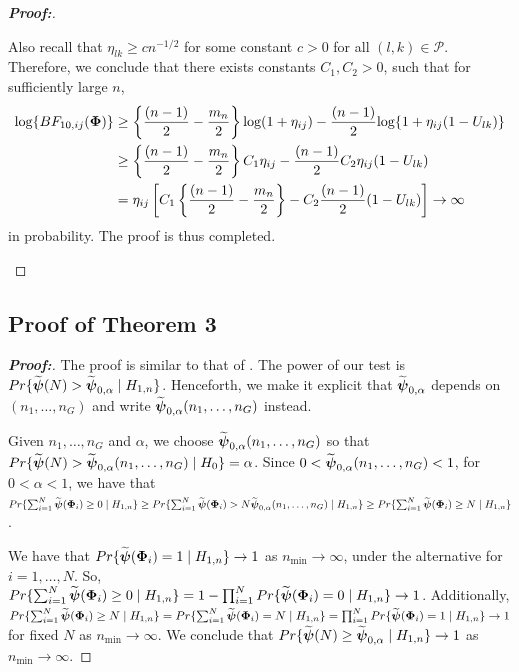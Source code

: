 \documentclass[times,sort&compress,3p]{elsarticle}
\theoremstyle{plain}%
\theoremstyle{definition}
\def\log{\hbox{log}}
\def\log{\hbox{log}}
\def\boldpsi{{\mbox{\boldmath $\psi$}}}
\newcommand{\uPhi}              {\mbox{\boldmath$\Phi$}}
\begin{document}
\begin{proof}[\textbf{\upshape Proof:}]
\begin{description}
{Also recall that $\eta_{lk} \geq cn^{-1/2}$ for some constant $c > 0$ for all $(l,k)\in\mathcal{P}$. Therefore, we conclude that there exists constants $C_1, C_2 > 0$, such that for sufficiently large $n$,
\begin{align*}
    \log\{BF_{10, ij}(\uPhi) \} & \geq \left\{\frac{(n - 1)}{2} - \frac{m_n}{2}\right\}\log(1 + \eta_{ij}) - \frac{(n - 1)}{2}\log\{1 + \eta_{ij}(1 - U_{lk})\}\\
    &\geq \left\{\frac{(n - 1)}{2} - \frac{m_n}{2}\right\}C_1\eta_{ij} - \frac{(n - 1)}{2}C_2\eta_{ij}(1 - U_{lk})\\
    & = \eta_{ij}\left[C_1\left\{\frac{(n - 1)}{2} - \frac{m_n}{2}\right\} - C_2\frac{(n - 1)}{2}(1 - U_{lk})\right]\to \infty
\end{align*}
in probability. The proof is thus completed. 
}

\end{description}
\end{proof}


\subsection*{Proof of Theorem 3}

\begin{proof}[\textbf{\upshape Proof:}]
The proof is similar to that of \cite{zoh2018powerful}. %
The power of our test is $Pr\{ \widetilde{\boldpsi}(N) > \widetilde{\boldpsi}_{0,\alpha}\mid  H_{1,n}\}$.
Henceforth, we make it explicit that $\widetilde{\boldpsi}_{0,\alpha}$ depends on $(n_1, \ldots ,n_G)$ and write $\widetilde{\boldpsi}_{0,\alpha}(n_1, \ldots, n_G)$ instead.

Given $n_1, \ldots, n_G$ and $\alpha$, we choose $\widetilde{\boldpsi}_{0,\alpha}(n_1, \ldots, n_G)$ so that $Pr\{\widetilde{\boldpsi}(N) > \widetilde{\boldpsi}_{0, \alpha}(n_1, \ldots,n_G)\mid  H_{0}\}  = \alpha$.
Since $ 0 < \widetilde{\boldpsi}_{0,\alpha}(n_1, \ldots,n_G) < 1$, for $0 < \alpha < 1$, we have that $Pr\{ \sum^{N}_{i=1}\widetilde{\boldpsi}(\uPhi_i) \geq 0 \mid H_{1,n} \} \geq Pr\{ \sum^{N}_{i=1}\widetilde{\boldpsi}(\uPhi_i) > N\widetilde{\boldpsi}_{0,\alpha}(n_1, \ldots ,n_G) \mid H_{1,n} \} \geq Pr\{ \sum^{N}_{i=1}\widetilde{\boldpsi}(\uPhi_i) \geq N \mid H_{1,n} \}$.

We have that $Pr\{\widetilde{\boldpsi}(\uPhi_i) =1 \mid H_{1,n}\} \rightarrow 1$ as $n_{\min} \rightarrow \infty$, under the alternative for $i = 1, \ldots, N$. So, $Pr\{ \sum^{N}_{i=1}\widetilde{\boldpsi}(\uPhi_i) \geq 0 \mid H_{1,n} \} = 1 - \prod_{i=1}^{N}Pr\{\widetilde{\boldpsi}(\uPhi_i) = 0 \mid H_{1,n} \} \rightarrow 1$.
Additionally, $Pr\{ \sum^{N}_{i=1}\widetilde{\boldpsi}(\uPhi_i) \geq N \mid H_{1,n} \} = Pr\{ \sum^{N}_{i=1}\widetilde{\boldpsi}(\uPhi_i) = N \mid H_{1,n} \} = \prod_{i=1}^{N}Pr\{\widetilde{\boldpsi}(\uPhi_i) = 1 \mid H_{1,n}\} \rightarrow 1$ for fixed $N$ as $n_{\min} \rightarrow \infty$. We conclude that $Pr\{ \widetilde{\boldpsi}(N) \geq \widetilde{\boldpsi}_{0, \alpha}\mid  H_{1,n}\} \rightarrow 1$ as $n_{\min} \rightarrow \infty.$
\end{proof}
\end{document}

